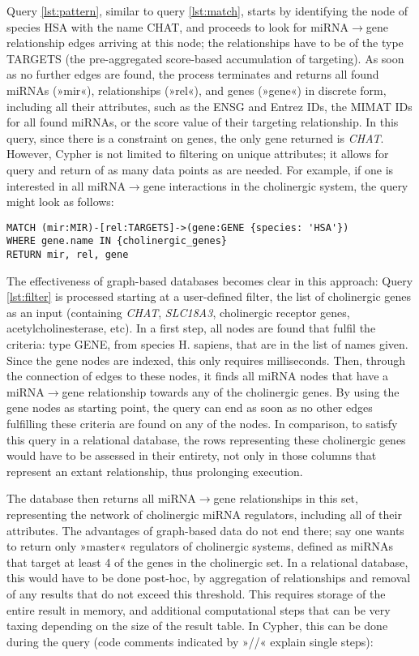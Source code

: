 Query \ref{lst:pattern}, similar to query \ref{lst:match}, starts by identifying the node of species HSA with the name CHAT, and proceeds to look for miRNA$\to$gene relationship edges arriving at this node; the relationships have to be of the type TARGETS (the pre-aggregated score-based accumulation of targeting). As soon as no further edges are found, the process terminates and returns all found miRNAs (»mir«), relationships (»rel«), and genes (»gene«) in discrete form, including all their attributes, such as the ENSG and Entrez IDs, the MIMAT IDs for all found miRNAs, or the score value of their targeting relationship. In this query, since there is a constraint on genes, the only gene returned is \textit{CHAT}. However, Cypher is not limited to filtering on unique attributes; it allows for query and return of as many data points as are needed. For example, if one is interested in all miRNA$\to$gene interactions in the cholinergic system, the query might look as follows:

\begin{lstlisting}[label=lst:filter,caption=Filtering,
language=Cypher]
MATCH (mir:MIR)-[rel:TARGETS]->(gene:GENE {species: 'HSA'})
WHERE gene.name IN {cholinergic_genes}
RETURN mir, rel, gene
\end{lstlisting}

The effectiveness of graph-based databases becomes clear in this approach: Query \ref{lst:filter} is processed starting at a user-defined filter, the list of cholinergic genes as an input (containing \textit{CHAT}, \textit{SLC18A3}, cholinergic receptor genes, acetylcholinesterase, etc). In a first step, all nodes are found that fulfil the criteria: type GENE, from species H. sapiens, that are in the list of names given. Since the gene nodes are indexed, this only requires milliseconds. Then, through the connection of edges to these nodes, it finds all miRNA nodes that have a miRNA$\to$gene relationship towards any of the cholinergic genes. By using the gene nodes as starting point, the query can end as soon as no other edges fulfilling these criteria are found on any of the nodes. In comparison, to satisfy this query in a relational database, the rows representing these cholinergic genes would have to be assessed in their entirety, not only in those columns that represent an extant relationship, thus prolonging execution.

The database then returns all miRNA$\to$gene relationships in this set, representing the network of cholinergic miRNA regulators, including all of their attributes. The advantages of graph-based data do not end there; say one wants to return only »master« regulators of cholinergic systems, defined as miRNAs that target at least 4 of the genes in the cholinergic set. In a relational database, this would have to be done post-hoc, by aggregation of relationships and removal of any results that do not exceed this threshold. This requires storage of the entire result in memory, and additional computational steps that can be very taxing depending on the size of the result table. In Cypher, this can be done during the query (code comments indicated by »\textcolor{dkgreen}{//}« explain single steps):

